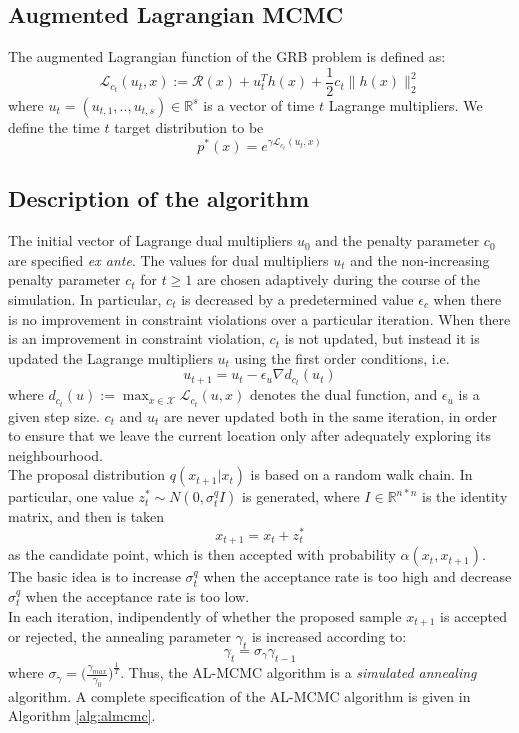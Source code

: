 {\subsection{Augmented Lagrangian MCMC}
The augmented Lagrangian function of the GRB problem is defined as:
\begin{equation}
\mathcal{L}_{c_t}(u_t, x) := \mathcal{R}(x) + u_t^T h(x) + \frac{1}{2} c_t \parallel h(x) \parallel^2_2
\end{equation}
where $u_t = (u_{t,1},..,u_{t,s}) \in \mathbb{R}^s$  is a vector of time $t$ Lagrange multipliers. We define the time $t$ target distribution to be
\begin{equation}
p^*(x) = e^{\gamma \mathcal{L}_{c_t}(u_t, x)}
\end{equation}

\subsection{Description of the algorithm}
The initial vector of Lagrange dual multipliers $u_0$ and the penalty parameter $c_0$ are specified \textit{ex ante}. The values for dual multipliers $u_t$ and the non-increasing penalty parameter $c_t$ for $t\geq 1$ are chosen adaptively during the course of the simulation. In particular, $c_t$ is decreased by
a predetermined value $\epsilon_c$ when there is no improvement in constraint violations over a particular iteration. When there is an improvement in constraint violation, $c_t$ is not updated, but instead it is updated the Lagrange multipliers $u_t$ using the first order conditions, i.e.
\begin{equation}
u_{t+1} = u_t - \epsilon_u \nabla d_{c_t}(u_t)
\end{equation}
where $d_{c_t}(u) := \max_{x \in \mathcal{X}}\mathcal{L}_{c_t}(u, x) $ denotes the dual function, and $\epsilon_u$ is a given step size. $c_t$ and $u_t$ are never updated both in the same iteration, in order to ensure that we leave the current location only after adequately exploring its neighbourhood.\\
The proposal distribution $q(x_{t+1}|x_t)$ is based on a random
walk chain. In particular, one value $z^*_t \sim N(0, \sigma^q_t I )$ is generated, where $I \in \mathbb{R}^{n*n}$ is the identity matrix, and then is taken
\begin{equation}
x_{t+1} = x_t + z_t^*
\end{equation}
as the candidate point, which is then accepted with probability $\alpha(x_t, x_{t+1})$. The basic idea is to increase $\sigma^q_t$ when the acceptance rate is too high and decrease $\sigma^q_t$ when the acceptance rate is too low.\\
In each iteration, indipendently of whether the proposed sample $x_{t+1}$ is accepted or rejected, the annealing parameter $\gamma_t$ is increased according to:
\begin{equation}
\gamma_t = \sigma_{\gamma}\gamma_{t-1}
\end{equation}
where $\sigma_{\gamma} = \big(\frac{\gamma_{max}}{\gamma_0}\big)^{\frac{1}{T}}$. Thus, the AL-MCMC algorithm is a \textit{simulated annealing} algorithm. A complete specification of the AL-MCMC algorithm is given in Algorithm \ref{alg:almcmc}.

}

